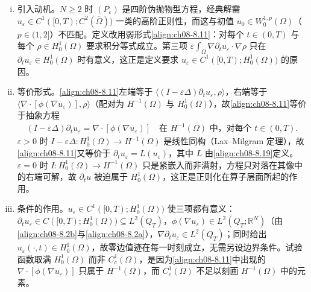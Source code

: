 \documentclass[../../main.tex]{subfiles}%
\begin{document}
\begin{remark}\label{remark:ch08-正则化解N2}
\begin{enumerate}[(i)]
\item 引入动机。$N\geqslant2$ 时 $(P_\varepsilon)$ 是四阶伪抛物型方程，经典解需 $u_\varepsilon\in C^1([0,T);C^2(\overline\Omega))$ 一类的高阶正则性，而这与初值 $u_0\in W^{1,p}_0(\Omega)$（$p\in(1,2]$）不匹配。定义改用弱形式\eqref{align:ch08-8.11}：对每个 $t\in(0,T)$ 与每个 $\rho\in H^1_0(\Omega)$ 要求积分等式成立。第三项 $\varepsilon\int_\Omega\nabla\partial_t u_\varepsilon\cdot\nabla\rho$ 只在 $\partial_t u_\varepsilon\in H^1_0(\Omega)$ 时有意义，这正是定义要求 $u_\varepsilon\in C^1([0,T);H^1_0(\Omega))$ 的原因。
\item 等价形式。\eqref{align:ch08-8.11}左端等于 $\langle(I-\varepsilon\Delta)\partial_t u_\varepsilon,\rho\rangle$，右端等于 $\langle\nabla\cdot[\phi(\nabla u_\varepsilon)],\rho\rangle$（配对为 $H^{-1}(\Omega)$ 与 $H^1_0(\Omega)$），故\eqref{align:ch08-8.11}等价于抽象方程
\begin{align*}
(I-\varepsilon\Delta)\partial_t u_\varepsilon=\nabla\cdot[\phi(\nabla u_\varepsilon)]\quad\text{在 }H^{-1}(\Omega)\text{ 中，对每个 }t\in(0,T).
\end{align*}
$\varepsilon>0$ 时 $I-\varepsilon\Delta:H^1_0(\Omega)\to H^{-1}(\Omega)$ 是线性同构（Lax--Milgram 定理），故\eqref{align:ch08-8.11}又等价于 $\partial_t u_\varepsilon=L(u_\varepsilon)$，其中 $L$ 由\eqref{align:ch08-8.19}定义。$\varepsilon=0$ 时 $I:H^1_0(\Omega)\to H^{-1}(\Omega)$ 只是紧嵌入而非满射，方程只对落在其像中的右端可解，故 $\partial_t u$ 被迫属于 $H^1_0(\Omega)$，这正是正则化在算子层面所起的作用。
\item 条件的作用。$u_\varepsilon\in C^1([0,T);H^1_0(\Omega))$ 使三项都有意义：$\partial_t u_\varepsilon\in C([0,T);H^1_0(\Omega))\subseteq L^2(Q_T)$，$\phi(\nabla u_\varepsilon)\in L^2(Q_T;\mathbb{R}^N)$（由\eqref{align:ch08-8.2b}与\eqref{align:ch08-8.2a}），$\nabla\partial_t u_\varepsilon\in L^2(Q_T)$；同时给出 $u_\varepsilon(\cdot,t)\in H^1_0(\Omega)$，故零边值迹在每一时刻成立，无需另设边界条件。试验函数取满 $H^1_0(\Omega)$ 而非 $C^1_c(\Omega)$，是因为\eqref{align:ch08-8.11}中出现的 $\nabla\cdot[\phi(\nabla u_\varepsilon)]$ 只属于 $H^{-1}(\Omega)$，而 $C^1_c(\Omega)$ 不足以刻画 $H^{-1}(\Omega)$ 中的元素。

\end{enumerate}
\end{remark}
\end{document}
